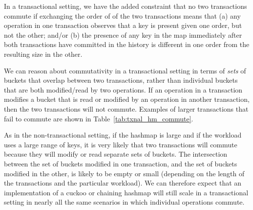 In a transactional setting, we have the added constraint that no two transactions commute if exchanging the order of of the two transactions means that (a) any operation in one transaction observes that a key is present given one order, but not the other; and/or (b) the presence of any key in the map immediately after both transactions have committed in the history is different in one order from the resulting size in the other.

We can reason about commutativity in a transactional setting in terms of \emph{sets} of buckets that overlap between two transactions, rather than individual buckets that are both modified/read by two operations. If an operation in a transaction modifies a bucket that is read or modified by an operation in another transaction, then the two transactions will not commute.
Examples of larger transactions that fail to commute are shown in Table~\ref{tab:txnal_hm_commute}.

As in the non-transactional setting, if the hashmap is large and if the workload uses a large range of keys, it is very likely that two transactions will commute because they will modify or read separate sets of buckets. 
The intersection between the set of buckets modified in one transaction, and the set of buckets modified in the other, is likely to be empty or small (depending on the length of the transactions and the particular workload). We can therefore expect that an implementation of a cuckoo or chaining hashmap will still scale in a transactional setting in nearly all the same scenarios in which individual operations commute. 


